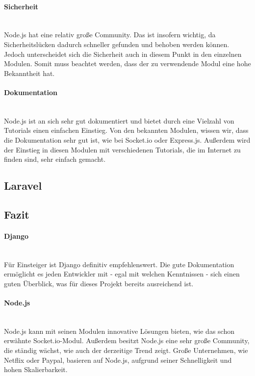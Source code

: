 \documentclass[11pt]{article}
\begin{document}
\paragraph{Sicherheit} \mbox{}\\
Node.js hat eine relativ gro{\ss}e Community. Das ist insofern wichtig, da Sicherheitsl\"ucken dadurch schneller gefunden und behoben werden k\"onnen. Jedoch unterscheidet sich die Sicherheit auch in diesem Punkt in den einzelnen Modulen. Somit muss beachtet werden, dass der zu verwendende Modul eine hohe Bekanntheit hat.

\paragraph{Dokumentation} \mbox{}\\
Node.js ist an sich sehr gut dokumentiert und bietet durch eine Vielzahl von Tutorials einen einfachen Einstieg. Von den bekannten Modulen, wissen wir, dass die Dokumentation sehr gut ist, wie bei Socket.io oder Express.js. Au{\ss}erdem wird der Einstieg in diesen Modulen mit verschiedenen Tutorials, die im Internet zu finden sind, sehr einfach gemacht.

\subsection{Laravel}
\subsection{Fazit}
\paragraph{Django} \mbox{}\\
F\"ur Einsteiger ist Django definitiv empfehlenswert. Die gute Dokumentation erm\"oglicht es jeden Entwickler mit - egal mit welchen Kenntnissen - sich einen guten \"Uberblick, was f\"ur dieses Projekt bereits ausreichend ist.
\paragraph{Node.js} \mbox{}\\
Node.js kann mit seinen Modulen innovative L\"osungen bieten, wie das schon erw\"ahnte Socket.io-Modul. Au{\ss}erdem besitzt Node.js eine sehr gro{\ss}e Community, die st\"andig w\"achst, wie auch der derzeitige Trend zeigt. Gro{\ss}e Unternehmen, wie Netflix oder Paypal, basieren auf Node.js, aufgrund seiner Schnelligkeit und hohen Skalierbarkeit.
\end{document}

